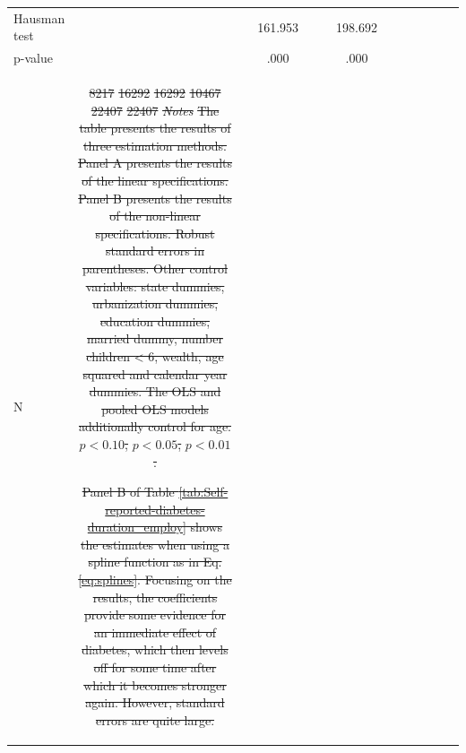 \documentclass[12pt,english]{article}
\providecommand{\DIFdeltex}[1]{{\protect\color{red}\sout{#1}}}                      %
\providecommand{\DIFdelFL}[1]{\DIFdel{#1}} %
\providecommand{\DIFaddendFL}{} %
\providecommand{\DIFdelbeginFL}{} %
\providecommand{\DIFdel}[1]{\texorpdfstring{\DIFdeltex{#1}}{}} %
\begin{document}
\begin{table}[!ht]
\begin{center}
\begin{adjustbox}{max width=0.8\linewidth}
\begin{threeparttable}
{\begin{tabular}{l*{6}{S
S}}
\DIFaddendFL Hausman test    &                  &                  &  161.953         &                  &                  &  198.692         \\
\hspace*{10mm} p-value         &                  &                  &     .000         &                  &                  &     .000         \\
N               &     \DIFdelbeginFL \DIFdelFL{8217         }%
\DIFdelFL{16292         }%
\DIFdelFL{16292         }%
\DIFdelFL{10467         }%
\DIFdelFL{22407         }%
\DIFdelFL{22407         }%
\textit{\DIFdelFL{Notes}} %
\DIFdelFL{The table presents the results of three estimation methods. Panel A presents the results of the linear specifications. Panel B presents the results of the non-linear specifications. Robust standard errors in parentheses. Other control variables: state dummies, urbanization dummies, education dummies, married dummy, number children < 6, wealth, age squared and calendar year dummies. The OLS and pooled OLS models additionally control for age. }%
\DIFdelFL{\(p<0.10\), }%
\DIFdelFL{\(p<0.05\), }%
\DIFdelFL{\(p<0.01\).
}%

\DIFdelFL{Panel B of Table \ref{tab:Self-reported-diabetes-duration_employ} shows the estimates when using a spline function as in Eq. \ref{eq:splines}. Focusing on the }%
\DIFdelFL{results, the coefficients provide some evidence for an immediate effect of diabetes, which then levels off for some time after which it becomes stronger again. However, standard errors are quite large.
}%


\end{tabular}}
\end{threeparttable}
\end{adjustbox}
\end{center}
\end{table}
\end{document}
